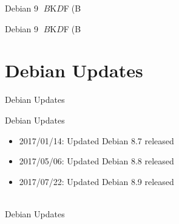{{\begin{frame}
\begin{center}
{\begin{frame}{Debian 9 $B$K$D$$$F(B}
\end{frame}


\begin{frame}{Debian 9 $B$K$D$$$F(B}%
\end{frame}


\section{Debian Updates}
\begin{frame}\begin{center}\Huge{Debian Updates}\end{center}\end{frame}


\begin{frame}{Debian Updates}%

\begin{itemize}[<+->]
\item 2017/01/14:  Updated Debian 8.7 released\\
\item 2017/05/06:  Updated Debian 8.8 released\\
\item 2017/07/22:  Updated Debian 8.9 released\\
\ \\
   \small{}

\end{itemize}

\end{frame}


\begin{frame}{Debian Updates}%

\begin{itemize}[<+->]
\item 2017/4/15:  Debian Project Leader Elections 2017 $BEjI<Dy$a@Z$j(B\\
\ \\
   \small{2017$BG/$N(BDebian$B%

}
\end{itemize}
\end{frame}}
\end{center}
\end{frame}}}
